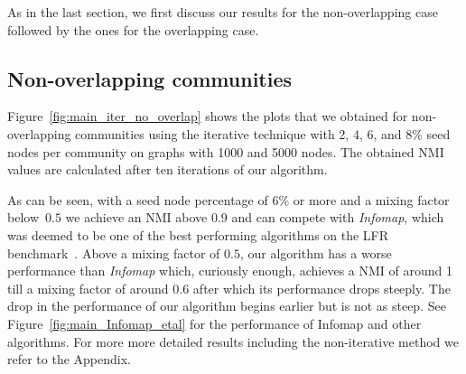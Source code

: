 \newcommand{\plotwidth}{0.8\linewidth}
\newcommand{\cfinderwidth}{0.96\linewidth}
\newcommand{\otherplotswidth}{0.76\linewidth}

As in the last section, we first discuss our results for the non-overlapping case followed by 
the ones for the overlapping case.

\subsection{Non-overlapping communities}
Figure~\ref{fig:main_iter_no_overlap} shows the plots that we obtained for non-overlapping 
communities using the iterative technique with 2, 4, 6, and 8$\%$ seed nodes per 
community on graphs with 1000 and 5000 nodes. The obtained NMI values are calculated 
after ten iterations of our algorithm.

As can be seen, with a seed node percentage of 6$\%$ or more and 
a mixing factor below~$0.5$ we achieve an NMI above $0.9$ and can compete with \textit{Infomap}, 
which was deemed to be one of the best performing algorithms on the LFR benchmark~\cite{LF09}. 
Above a mixing factor of $0.5$, our algorithm has a worse performance than \textit{Infomap} 
which, curiously enough, achieves a NMI of around 1 till a mixing factor of around 
$0.6$ after which its performance drops steeply. The drop in the performance of our algorithm 
begins earlier but is not as steep. See Figure~\ref{fig:main_Infomap_etal} for the performance 
of Infomap and other algorithms.
For more more detailed results including the non-iterative method we refer to the Appendix.
 
 


